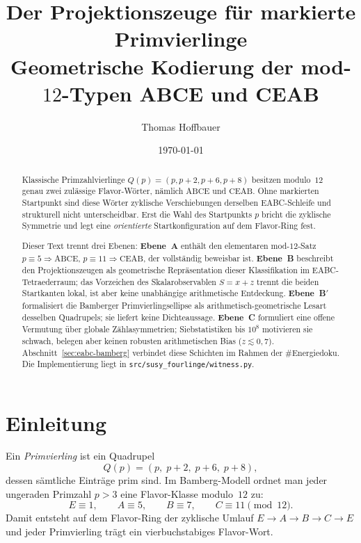 \documentclass[11pt,a4paper]{article}
\title{Der Projektionszeuge für markierte Primvierlinge\\
	\large Geometrische Kodierung der mod-$12$-Typen ABCE und CEAB}
\author{Thomas Hoffbauer}
\date{\today}
\theoremstyle{definition}
\theoremstyle{plain}
\begin{document}
	\maketitle
	
	\begin{abstract}
		Klassische Primzahlvierlinge $Q(p)=(p,p+2,p+6,p+8)$ besitzen modulo~$12$ genau zwei zulässige Flavor-Wörter, nämlich $\mathrm{ABCE}$ und $\mathrm{CEAB}$. Ohne markierten Startpunkt sind diese Wörter zyklische Verschiebungen derselben EABC-Schleife und strukturell nicht unterscheidbar. Erst die Wahl des Startpunkts $p$ bricht die zyklische Symmetrie und legt eine \emph{orientierte} Startkonfiguration auf dem Flavor-Ring fest.
		
		Dieser Text trennt drei Ebenen: \textbf{Ebene~A} enthält den elementaren mod-$12$-Satz $p\equiv 5\Rightarrow\mathrm{ABCE}$, $p\equiv 11\Rightarrow\mathrm{CEAB}$, der vollständig beweisbar ist. \textbf{Ebene~B} beschreibt den Projektionszeugen als geometrische Repräsentation dieser Klassifikation im EABC-Tetraederraum; das Vorzeichen des Skalarobservablen $S=x+z$ trennt die beiden Startkanten lokal, ist aber keine unabhängige arithmetische Entdeckung. \textbf{Ebene~B$'$} formalisiert die Bamberger Primvierlingsellipse als arithmetisch-geometrische Lesart desselben Quadrupels; sie liefert keine Dichteaussage. \textbf{Ebene~C} formuliert eine offene Vermutung über globale Zählasymmetrien; Siebstatistiken bis $10^8$ motivieren sie schwach, belegen aber keinen robusten arithmetischen Bias ($z\lesssim 0{,}7$). Abschnitt~\ref{sec:eabc-bamberg} verbindet diese Schichten im Rahmen der \#Energiedoku. Die Implementierung liegt in \texttt{src/susy\_fourlinge/witness.py}.
	\end{abstract}
	
	\tableofcontents
	
	\section{Einleitung}
	
	Ein \emph{Primvierling} ist ein Quadrupel
	\[
	Q(p)=(p,\;p+2,\;p+6,\;p+8),
	\]
	dessen sämtliche Einträge prim sind. Im Bamberg-Modell ordnet man jeder ungeraden Primzahl $p>3$ eine Flavor-Klasse modulo~$12$ zu:
	\[
	E\equiv 1,\qquad A\equiv 5,\qquad B\equiv 7,\qquad C\equiv 11 \pmod{12}.
	\]
	Damit entsteht auf dem Flavor-Ring der zyklische Umlauf $E\to A\to B\to C\to E$ und jeder Primvierling trägt ein vierbuchstabiges Flavor-Wort.
	
\end{document}
